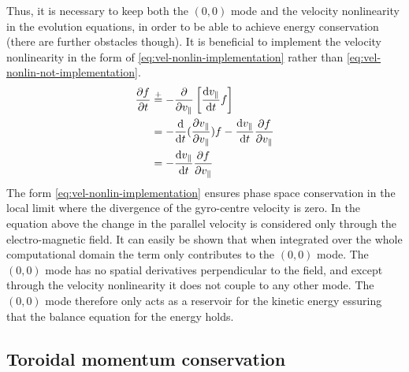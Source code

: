 Thus, it is necessary to keep both the $(0,0)$ mode
and the velocity nonlinearity in the evolution equations, in order to be able to achieve energy conservation (there are further obstacles though).
It is beneficial to implement  the velocity nonlinearity in the form of \eqref{eq:vel-nonlin-implementation} rather than \eqref{eq:vel-nonlin-not-implementation}.
\begin{align} 
\frac{\partial f}{\partial t} &\overset{+}{=} -\frac{\partial }{\partial v_\parallel} \left [ \frac{\mathrm{d} v_\parallel}{\mathrm{d} t} f \right ] 
\label{eq:vel-nonlin-implementation}
\\
&= -\frac{\mathrm{d} }{\mathrm{d} t}(\frac{\partial v_\parallel}{\partial v_\parallel}) f - \frac{\mathrm{d} v_\parallel}{\mathrm{d} t} \frac{\partial f}{\partial v_\parallel}\nonumber\\
&= - \frac{\mathrm{d} v_\parallel}{\mathrm{d} t} \frac{\partial f}{\partial v_\parallel}
\label{eq:vel-nonlin-not-implementation}
\end{align}
The form \eqref{eq:vel-nonlin-implementation} ensures phase space conservation in the local limit where the divergence of the gyro-centre velocity is zero. 
In the equation above the change in the parallel velocity is considered only through the electro-magnetic field. 
It can easily be shown that when integrated over the whole computational domain the term only contributes to the $(0,0)$ mode. 
The $(0,0)$ mode has no spatial derivatives perpendicular to the field, and except through the velocity nonlinearity it does not couple to any other mode. 
The $(0,0)$ mode therefore only acts as a reservoir for the kinetic energy essuring that the balance equation for the energy holds. 


\subsection{Toroidal momentum conservation} 

